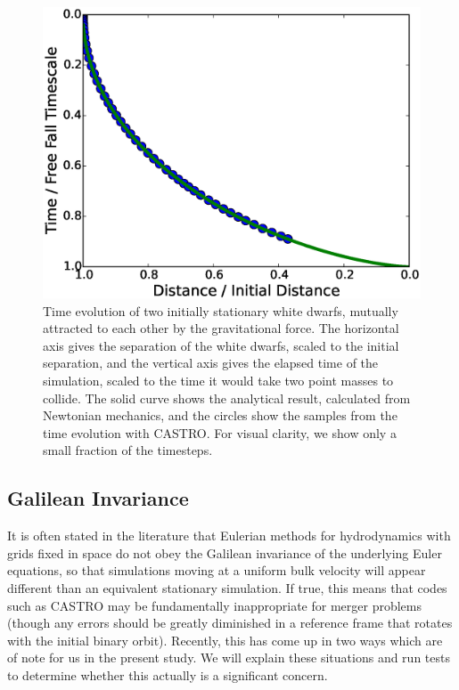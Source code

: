 \documentclass{emulateapj}
\begin{document}
\begin{figure}
  \centering
  \includegraphics[scale=0.45]{plots/freefall}
  \caption{Time evolution of two initially stationary white dwarfs,
    mutually attracted to each other by the gravitational force. The
    horizontal axis gives the separation of the white dwarfs, scaled
    to the initial separation, and the vertical axis gives the elapsed
    time of the simulation, scaled to the time it would take two point masses
    to collide. The solid curve shows the analytical result,
    calculated from Newtonian mechanics, and the circles show the
    samples from the time evolution with CASTRO. For visual clarity, we 
    show only a small fraction of the timesteps.}
  \label{Fig:Free Fall}
\end{figure}

\subsection{Galilean Invariance}\label{sec:galileo}

It is often stated in the literature that Eulerian methods for
hydrodynamics with grids fixed in space do not obey the Galilean
invariance of the underlying Euler equations, so that simulations
moving at a uniform bulk velocity will appear different than an
equivalent stationary simulation. If true, this means that codes such
as CASTRO may be fundamentally inappropriate for merger problems
(though any errors should be greatly diminished in a reference frame
that rotates with the initial binary orbit). Recently, this has come
up in two ways which are of note for us in the present study. We will
explain these situations and run tests to determine whether this
actually is a significant concern.
\end{document}
